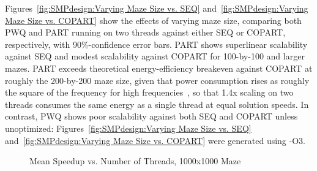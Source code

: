 Figures~\ref{fig:SMPdesign:Varying Maze Size vs. SEQ}
and~\ref{fig:SMPdesign:Varying Maze Size vs. COPART}
show the effects of varying maze size, comparing both PWQ and PART
running on two threads
against either SEQ or COPART, respectively, with 90\%-confidence
error bars.
PART shows superlinear scalability against SEQ and modest scalability
against COPART for 100-by-100 and larger mazes.
PART exceeds theoretical energy-efficiency breakeven against COPART at roughly
the 200-by-200 maze size, given that power consumption rises as roughly
the square of the frequency for high frequencies~\cite{TrevorMudge2000Power},
so that 1.4x scaling on two threads consumes the same energy
as a single thread at equal solution speeds.
In contrast, PWQ shows poor scalability against both SEQ and COPART
unless unoptimized: Figures~\ref{fig:SMPdesign:Varying Maze Size vs. SEQ} 
and~\ref{fig:SMPdesign:Varying Maze Size vs. COPART}
were generated using -O3.
\fi

\begin{figure}[tb]
\centering
{}
\caption{Mean Speedup vs. Number of Threads, 1000x1000 Maze}
\label{fig:SMPdesign:Mean Speedup vs. Number of Threads, 1000x1000 Maze}
\end{figure}

